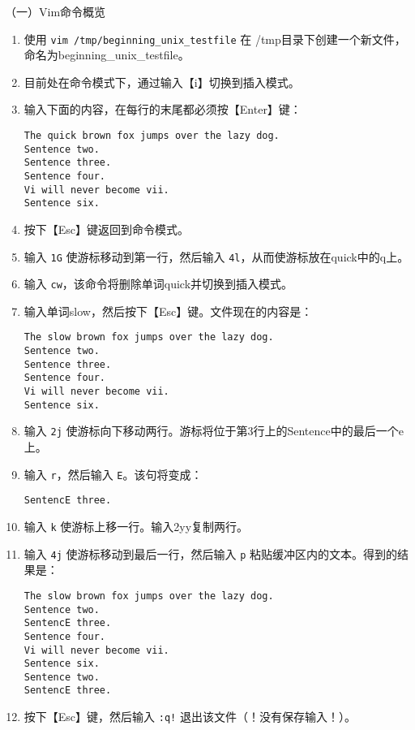 \vspace{0.1in}
（一）Vim命令概览
    \begin{enumerate}
      \item 使用 \verb|vim /tmp/beginning_unix_testfile| 在 /tmp目录下创建一个新文件，命名为beginning\_unix\_testfile。
      \item 目前处在命令模式下，通过输入【i】切换到插入模式。
      \item 输入下面的内容，在每行的末尾都必须按【Enter】键：
\begin{verbatim}
The quick brown fox jumps over the lazy dog.
Sentence two.
Sentence three.
Sentence four.
Vi will never become vii.
Sentence six.
\end{verbatim}
      \item 按下【Esc】键返回到命令模式。
      \item 输入 \verb|1G| 使游标移动到第一行，然后输入 \verb|4l|，从而使游标放在quick中的q上。
      \item 输入 \verb|cw|，该命令将删除单词quick并切换到插入模式。
      \item 输入单词slow，然后按下【Esc】键。文件现在的内容是：
\begin{verbatim}
The slow brown fox jumps over the lazy dog.
Sentence two.
Sentence three.
Sentence four.
Vi will never become vii.
Sentence six.
\end{verbatim}
      \item 输入 \verb|2j| 使游标向下移动两行。游标将位于第3行上的Sentence中的最后一个e上。
      \item 输入 \verb|r|，然后输入 \verb|E|。该句将变成：
\begin{verbatim}
SentencE three.
\end{verbatim}
      \item 输入 \verb|k| 使游标上移一行。输入2yy复制两行。
      \item 输入 \verb|4j| 使游标移动到最后一行，然后输入 \verb|p| 粘贴缓冲区内的文本。得到的结果是：
\begin{verbatim}
The slow brown fox jumps over the lazy dog.
Sentence two.
SentencE three.
Sentence four.
Vi will never become vii.
Sentence six.
Sentence two.
SentencE three.
\end{verbatim}
      \item 按下【Esc】键，然后输入 \verb|:q!| 退出该文件（！没有保存输入！）。
    \end{enumerate}

